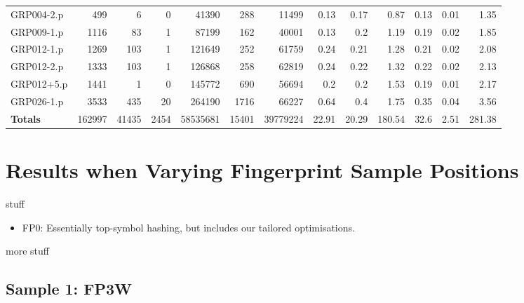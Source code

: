 \begin{table}[H]
\begin{adjustwidth}{-0.4in}{-0.5in}
\begin{tabular}{| l || r | r | r || r | r | r || r | r | r | r | r | r |}
GRP004-2.p&499&6&0&41390&288&11499&0.13&0.17&0.87&0.13&0.01&1.35\\
GRP009-1.p&1116&83&1&87199&162&40001&0.13&0.2&1.19&0.19&0.02&1.85\\
GRP012-1.p&1269&103&1&121649&252&61759&0.24&0.21&1.28&0.21&0.02&2.08\\
GRP012-2.p&1333&103&1&126868&258&62819&0.24&0.22&1.32&0.22&0.02&2.13\\
GRP012+5.p&1441&1&0&145772&690&56694&0.2&0.2&1.53&0.19&0.01&2.17\\
GRP026-1.p&3533&435&20&264190&1716&66227&0.64&0.4&1.75&0.35&0.04&3.56\\ \hline \hline
\textbf{Totals}&162997&41435&2454&58535681&15401&39779224&22.91&20.29&180.54&32.6&2.51&281.38 \\ \hline
\end{tabular}\end{adjustwidth}\end{table}


\chapter{Results when Varying Fingerprint Sample Positions}
\label{app:app2}

stuff

\begin{itemize}
\item FP0: Essentially top-symbol hashing, but includes our tailored optimisations.
\end{itemize}

more stuff

\section{Sample 1: FP3W}

